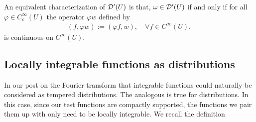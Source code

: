 \documentclass[
    a4paper,
    DIV=14,
    abstract=true,
    numbers=noenddot
]{scrartcl}
\begin{document}
An equivalent characterization of $\mathcal{D}'(U)$ \cite[page 241]{taylor2013partial} is that,  $\omega \in  \mathcal{D}'(U)$ if and only if for all $\varphi \in C_c^\infty(U)$ the operator $\varphi w$ defined by \begin{align}\label{equiv}
	(f, \varphi w):= (\varphi f, w), \quad\forall f \in C^\infty(U),
\end{align}
is continuous on $C^\infty(U)$.
\subsection{Locally integrable functions as distributions}%
In our post on the Fourier transform  that integrable functions could naturally be considered as tempered distributions. The analogous is true for distributions. In this case, since our test functions are compactly supported, the functions we pair them up with only need to be locally integrable. We recall the definition
\end{document}
